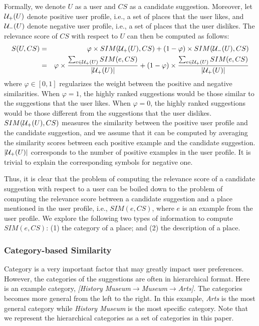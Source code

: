 Formally, we denote $U$ as a user and $CS$ as a candidate suggestion. 
Moreover, let ${\cal U}_{+}(U)$ denote positive user profile, 
i.e., a set of places that the user likes, 
and ${\cal U}_{-}(U)$ denote negative user profile, i.e., a set 
of places that the user dislikes. The relevance score of $CS$ with 
respect to $U$ can then be computed as follows:  
\begin{eqnarray}
    S(U,CS) &=& \varphi \times SIM({\cal U}_{+}(U),CS) + (1-\varphi) \times SIM({\cal U}_{-}(U),CS) \\
&=& \varphi \times \frac{\sum_{e \in {\cal U}_{+}(U)}{SIM(e,CS)}}{|{\cal U}_{+}(U)|} 
+ (1-\varphi) \times \frac{\sum_{e \in {\cal U}_{+}(U)}{SIM(e,CS)}}{|{\cal U}_{+}(U)|} 
\label{chap5_eq1}
\end{eqnarray}
where $\varphi \in [0,1]$ regularizes the weight between the 
positive and negative similarities. When $\varphi=1$, the highly ranked 
suggestions would be those similar to the suggestions that the user likes. 
When $\varphi=0$, the highly ranked suggestions would be those 
different from the suggestions that the user dislikes. 
$SIM({\cal U}_{+}(U),CS)$ measures the similarity between the 
positive user profile and the candidate suggestion, 
and we assume that it can be computed 
by averaging the similarity scores between each positive example and 
the candidate suggestion. $|{\cal U}_{+}(U)|$ corresponds to the number of 
positive examples in the user profile. It is trivial to explain the 
corresponding symbols for negative one.

Thus, it is clear that the problem of computing the relevance score 
of a candidate suggestion with respect to a user can be boiled down 
to the problem of computing the relevance score between a candidate
suggestion and a place mentioned in the user profile, i.e., $SIM(e,CS)$, 
where $e$ is an example from the user profile. We explore the following 
two types of information to compute $SIM(e,CS)$: (1) the category 
of a place; and (2) the description of a place. 


\subsubsection{Category-based Similarity}
Category is a very important factor that may greatly impact user preferences. 
However, the categories of the suggestions are often in hierarchical format. 
Here is an example category, 
\textit{[History Museum$\to$Museum$\to$Arts].}
The categories becomes more general from the left to the right. 
In this example, \textit{Arts} is the most general category
while \textit{History Museum} is the most specific category.
Note that we represent the hierarchical categories
as a set of categories in this paper. 


